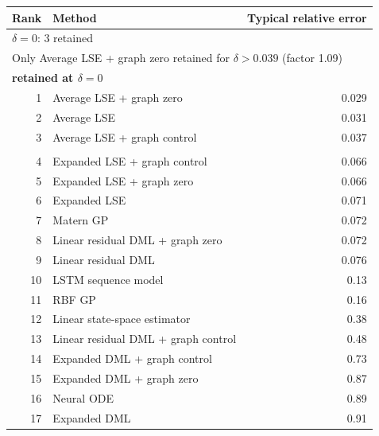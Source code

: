 \begin{tabular}{rlr}
\toprule
Rank & Method & Typical relative error \\
\midrule
\multicolumn{3}{l}{\(\delta=0\): 3 retained} \\
\multicolumn{3}{l}{Only Average LSE + graph zero retained for \(\delta>0.039\) (factor 1.09)} \\
\multicolumn{3}{l}{\textbf{retained at \(\delta=0\)}} \\
1 & Average LSE + graph zero & 0.029 \\
2 & Average LSE & 0.031 \\
3 & Average LSE + graph control & 0.037 \\
\addlinespace[2pt]
\multicolumn{3}{l}{\textbf{not retained at \(\delta=0\)}} \\
4 & Expanded LSE + graph control & 0.066 \\
5 & Expanded LSE + graph zero & 0.066 \\
6 & Expanded LSE & 0.071 \\
7 & Matern GP & 0.072 \\
8 & Linear residual DML + graph zero & 0.072 \\
9 & Linear residual DML & 0.076 \\
10 & LSTM sequence model & 0.13 \\
11 & RBF GP & 0.16 \\
12 & Linear state-space estimator & 0.38 \\
13 & Linear residual DML + graph control & 0.48 \\
14 & Expanded DML + graph control & 0.73 \\
15 & Expanded DML + graph zero & 0.87 \\
16 & Neural ODE & 0.89 \\
17 & Expanded DML & 0.91 \\
\bottomrule
\end{tabular}
